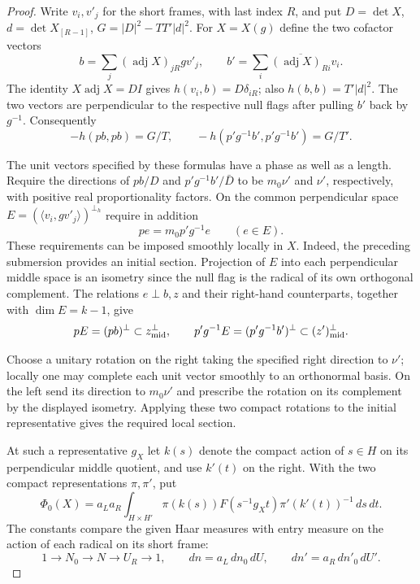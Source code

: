 \begin{proof}
Write \(v_i,v'_j\) for the short frames, with last index \(R\), and
put \(D=\det X\), \(d=\det X_{[R-1]}\), \(G=|D|^2-TT'|d|^2\).
For \(X=X(g)\) define the two cofactor vectors
\[
 b=\sum_j(\operatorname{adj} X)_{jR}g v'_j,\qquad
 b'=\sum_i\overline{(\operatorname{adj} X)_{Ri}}v_i .
\]
The identity \(X\operatorname{adj}X=D I\) gives
\(h(v_i,b)=D\delta_{iR}\); also \(h(b,b)=T'|d|^2\).
The two vectors are perpendicular to the respective null flags after
pulling \(b'\) back by \(g^{-1}\). Consequently
\[
 -h(pb,pb)=G/T,\qquad
 -h(p'g^{-1}b',p'g^{-1}b')=G/T'.
\]

The unit vectors specified by these formulas have a phase as well as
a length. Require the directions of \(pb/D\) and
\(p'g^{-1}b'/\bar D\) to be \(m_0\nu'\) and \(\nu'\), respectively,
with positive real proportionality factors. On the common
perpendicular space \(E=(\langle v_i,g v'_j\rangle)^{\perp_h}\)
require in addition
\[
                         pe=m_0p'g^{-1}e\qquad(e\in E).
\]
These requirements can be imposed smoothly locally in \(X\).
Indeed, the preceding submersion provides an initial section.
Projection of \(E\) into each perpendicular middle space is an
isometry since the null flag is the radical of its own orthogonal
complement. The relations \(e\perp b,z\) and their right-hand
counterparts, together with \(\dim E=k-1\), give
\[
 pE=(pb)^\perp\subset z^\perp_{\rm mid},\qquad
 p'g^{-1}E=(p'g^{-1}b')^\perp\subset (z')^\perp_{\rm mid}.
\]

Choose a unitary rotation on the right taking the
specified right direction to \(\nu'\); locally one may complete each
unit vector smoothly to an orthonormal basis. On the left send its
direction to \(m_0\nu'\) and prescribe the rotation on its complement
by the displayed isometry. Applying these two compact rotations to
the initial representative gives the required local section.

At such a representative \(g_X\) let \(k(s)\) denote the compact
action of \(s\in H\) on its perpendicular middle quotient, and use
\(k'(t)\) on the right. With the two compact representations
\(\pi,\pi'\), put
\begin{equation}\label{eq:oriented-terminal-fibre}
 \Phi_0(X)=a_La_R\int_{H\times H'}
       \pi(k(s)) F(s^{-1}g_Xt)\pi'(k'(t))^{-1}\,ds\,dt .
\end{equation}
The constants compare the given Haar measures with entry measure
on the action of each radical on its short frame:
\[
 1\longrightarrow N_0\longrightarrow N\longrightarrow U_R\longrightarrow1,
 \qquad dn=a_L\,dn_0\,dU,\qquad dn'=a_R\,dn'_0\,dU'.
\]


\end{proof}
